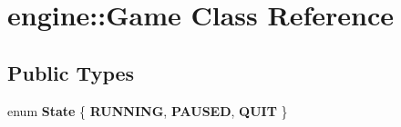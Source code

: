 \hypertarget{classengine_1_1_game}{}\section{engine\+:\+:Game Class Reference}
\label{classengine_1_1_game}
\subsection*{Public Types}
\begin{DoxyCompactItemize}
\item 
enum {\bfseries State} \{ {\bfseries R\+U\+N\+N\+I\+NG}, 
{\bfseries P\+A\+U\+S\+ED}, 
{\bfseries Q\+U\+IT}
 \}\hypertarget{classengine_1_1_game_a4929fccb048ef64bc376c3950c4098e7}{}\label{classengine_1_1_game_a4929fccb048ef64bc376c3950c4098e7}

\end{DoxyCompactItemize}
